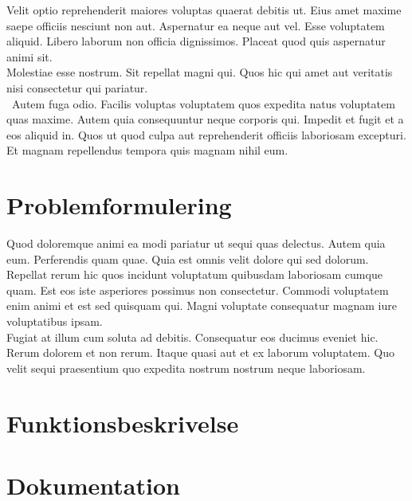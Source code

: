 \documentclass[12pt]{article}
\begin{document}
Velit optio reprehenderit maiores voluptas quaerat debitis ut. Eius amet maxime saepe officiis nesciunt non aut. Aspernatur ea neque aut vel. Esse voluptatem aliquid. Libero laborum non officia dignissimos. Placeat quod quis aspernatur animi sit.
\\
Molestiae esse nostrum. Sit repellat magni qui. Quos hic qui amet aut veritatis nisi consectetur qui pariatur.
\\\
Autem fuga odio. Facilis voluptas voluptatem quos expedita natus voluptatem quas maxime. Autem quia consequuntur neque corporis qui. Impedit et fugit et a eos aliquid in. Quos ut quod culpa aut reprehenderit officiis laboriosam excepturi. Et magnam repellendus tempora quis magnam nihil eum.

\section{Problemformulering}

Quod doloremque animi ea modi pariatur ut sequi quas delectus. Autem quia eum. Perferendis quam quae. Quia est omnis velit dolore qui sed dolorum.
\\
Repellat rerum hic quos incidunt voluptatum quibusdam laboriosam cumque quam. Est eos iste asperiores possimus non consectetur. Commodi voluptatem enim animi et est sed quisquam qui. Magni voluptate consequatur magnam iure voluptatibus ipsam.
\\
Fugiat at illum cum soluta ad debitis. Consequatur eos ducimus eveniet hic. Rerum dolorem et non rerum. Itaque quasi aut et ex laborum voluptatem. Quo velit sequi praesentium quo expedita nostrum nostrum neque laboriosam.

\vfill
\pagebreak

\section{Funktionsbeskrivelse}

\vfill
\pagebreak

\section{Dokumentation}
\end{document}

